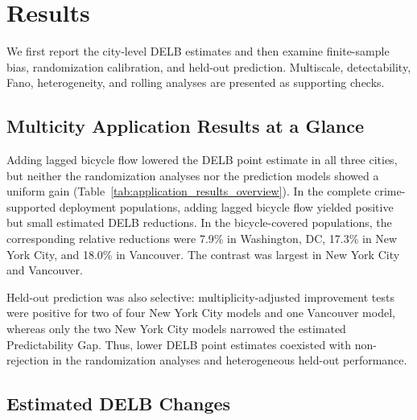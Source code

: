 \section{Results}
\label{sec:results}

We first report the city-level DELB estimates and then examine finite-sample
bias, randomization calibration, and held-out prediction. Multiscale,
detectability, Fano, heterogeneity, and rolling analyses are presented as
supporting checks.

\subsection{Multicity Application Results at a Glance}
\label{subsec:application_results_overview}



Adding lagged bicycle flow lowered the DELB point estimate in all three
cities, but neither the randomization analyses nor the prediction models
showed a uniform gain (Table~\ref{tab:application_results_overview}). In the complete
crime-supported deployment populations, adding lagged bicycle flow yielded
positive but small estimated DELB reductions. In the bicycle-covered
populations, the corresponding relative reductions were 7.9\% in Washington,
DC, 17.3\% in New York City, and 18.0\% in Vancouver. The contrast was largest
in New York City and Vancouver.

Held-out prediction was also selective: multiplicity-adjusted improvement
tests were positive for two of four New York City models and one Vancouver
model, whereas only the two New York City models narrowed the estimated
Predictability Gap. Thus, lower DELB point estimates coexisted with
non-rejection in the randomization analyses and heterogeneous held-out
performance.

\subsection{Estimated DELB Changes}
\label{subsec:results_city_information}

